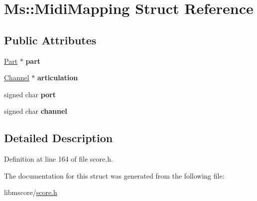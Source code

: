 \hypertarget{struct_ms_1_1_midi_mapping}{}\section{Ms\+:\+:Midi\+Mapping Struct Reference}
\label{struct_ms_1_1_midi_mapping}
\subsection*{Public Attributes}
\begin{DoxyCompactItemize}
\item 
\mbox{\label{struct_ms_1_1_midi_mapping_ac2285f9118559fde07cfdd705f0b7901}} 
\hyperlink{class_ms_1_1_part}{Part} $\ast$ {\bfseries part}
\item 
\mbox{\label{struct_ms_1_1_midi_mapping_a9007a01c3362d917999f515775d9a490}} 
\hyperlink{struct_ms_1_1_channel}{Channel} $\ast$ {\bfseries articulation}
\item 
\mbox{\label{struct_ms_1_1_midi_mapping_ab884056b857c3ca3c82a9f27ca011a1a}} 
signed char {\bfseries port}
\item 
\mbox{\label{struct_ms_1_1_midi_mapping_a884548b812b59c0b69e79f9208fee334}} 
signed char {\bfseries channel}
\end{DoxyCompactItemize}


\subsection{Detailed Description}


Definition at line 164 of file score.\+h.



The documentation for this struct was generated from the following file\+:\begin{DoxyCompactItemize}
\item 
libmscore/\hyperlink{score_8h}{score.\+h}\end{DoxyCompactItemize}
